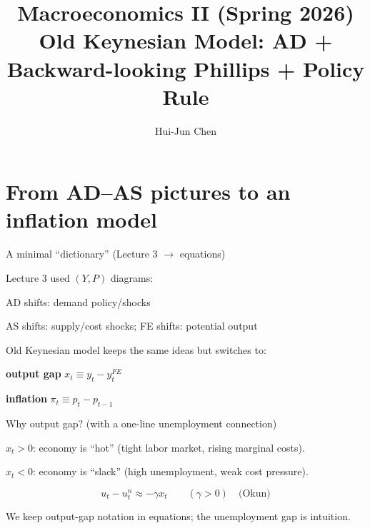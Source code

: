 \documentclass[aspectratio=169,xcolor=dvipsnames]{beamer}
\title[Old Keynesian]{Macroeconomics II (Spring 2026)\\\vspace{4pt}Old Keynesian Model: AD + Backward-looking Phillips + Policy Rule}
\author[Hui-Jun Chen]{Hui-Jun Chen}
\institute[]{National Tsing Hua University}
\date{}
\let\tempone\itemize
\let\temptwo\enditemize
\renewenvironment{itemize}{\tempone\addtolength{\itemsep}{\fill}}{\temptwo}
\begin{document}
\begin{frame}
    \titlepage
\end{frame}

\section{From AD--AS pictures to an inflation model}

\begin{frame}{A minimal ``dictionary'' (Lecture 3 $\rightarrow$ equations)}
\begin{itemize}
\item Lecture 3 used $(Y,P)$ diagrams:
\begin{itemize}
\item AD shifts: demand policy/shocks
\item AS shifts: supply/cost shocks; FE shifts: potential output
\end{itemize}
\item Old Keynesian model keeps the same ideas but switches to:
\begin{itemize}
\item \textbf{output gap} $x_t \equiv y_t - y_t^{FE}$
\item \textbf{inflation} $\pi_t \equiv p_t - p_{t-1}$
\end{itemize}
\end{itemize}
\end{frame}

\begin{frame}{Why output gap? (with a one-line unemployment connection)}
\begin{itemize}
\item $x_t>0$: economy is ``hot'' (tight labor market, rising marginal costs).
\item $x_t<0$: economy is ``slack'' (high unemployment, weak cost pressure).
\end{itemize}

\[
u_t-u_t^n \approx -\gamma x_t
\qquad (\gamma>0)\quad\text{(Okun)}
\]

\begin{itemize}
\item We keep output-gap notation in equations; the unemployment gap is intuition.
\end{itemize}
\end{frame}
\end{document}
